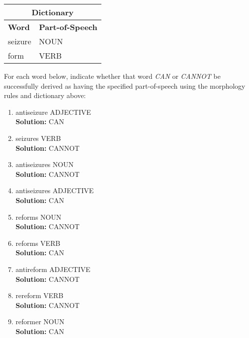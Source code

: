 \documentclass[11pt]{article}
\begin{document}
\begin{enumerate}
\begin{center}
\begin{tabular}{|l|l|} \hline
\multicolumn{2}{|c|}{\bf Dictionary} \\ \hline
{\bf Word} & {\bf Part-of-Speech} \\ \hline
seizure & NOUN \\
form & VERB \\ \hline
\end{tabular}
\end{center}

For each word below, indicate whether that word {\it CAN} or {\it CANNOT} be
successfully derived as having the specified part-of-speech using the
morphology rules and dictionary above:

\begin{enumerate}
\item antiseizure ADJECTIVE \\
\textbf{Solution:} CAN\\

\item seizures VERB \\
\textbf{Solution:} CANNOT\\

\item antiseizures NOUN \\
\textbf{Solution:} CANNOT\\

\item antiseizures ADJECTIVE \\
\textbf{Solution:} CAN\\

\item reforms NOUN \\
\textbf{Solution:} CANNOT\\

\item reforms VERB \\
\textbf{Solution:} CAN\\

\item antireform ADJECTIVE \\
\textbf{Solution:} CANNOT\\

\item rereform VERB \\
\textbf{Solution:} CANNOT\\

\item reformer NOUN \\
\textbf{Solution:} CAN\\


\end{enumerate}
\end{enumerate}
\end{document}
